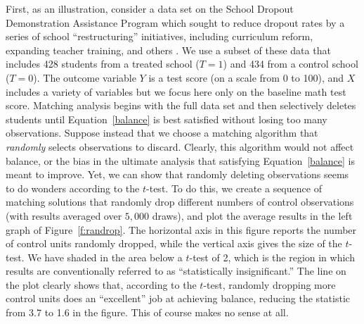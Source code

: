 \documentclass[11pt,titlepage]{article}
\begin{document}
First, as an illustration, consider a data set on the School Dropout
Demonstration Assistance Program which sought to reduce dropout rates
by a series of school ``restructuring'' initiatives, including
curriculum reform, expanding teacher training, and others
\citep{AgoDyn04,Stuart04}.  We use a subset of these data that
includes 428 students from a treated school ($T=1$) and 434 from a
control school ($T=0$).  The outcome variable $Y$ is a test score (on
a scale from 0 to 100), and $X$ includes a variety of variables but we
focus here only on the baseline math test score.  Matching analysis
begins with the full data set and then selectively deletes students
until Equation~\ref{balance} is best satisfied without losing too many
observations.  Suppose instead that we choose a matching algorithm
that \emph{randomly} selects observations to discard.  Clearly, this
algorithm would not affect balance, or the bias in the ultimate
analysis that satisfying Equation~\ref{balance} is meant to improve.
Yet, we can show that randomly deleting observations seems to do
wonders according to the $t$-test.  To do this, we create a sequence
of matching solutions that randomly drop different numbers of control
observations (with results averaged over $5,000$ draws), and plot the
average results in the left graph of Figure~\ref{f:randrop}.  The
horizontal axis in this figure reports the number of control units
randomly dropped, while the vertical axis gives the size of the
$t$-test.  We have shaded in the area below a $t$-test of 2, which is
the region in which results are conventionally referred to as
``statistically insignificant.''  The line on the plot clearly shows
that, according to the $t$-test, randomly dropping more control units
does an ``excellent'' job at achieving balance, reducing the statistic
from 3.7 to 1.6 in the figure.  This of course makes no sense at all.
\end{document}
